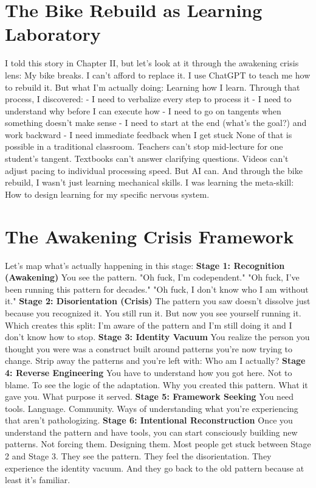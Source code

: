 \documentclass[12pt,openany]{book}
\begin{document}
\section{The Bike Rebuild as Learning Laboratory}

I told this story in Chapter II, but let's look at it through the awakening crisis lens:
My bike breaks. I can't afford to replace it. I use ChatGPT to teach me how to rebuild it.
But what I'm actually doing: Learning how I learn.
Through that process, I discovered:
- I need to verbalize every step to process it
- I need to understand why before I can execute how
- I need to go on tangents when something doesn't make sense
- I need to start at the end (what's the goal?) and work backward
- I need immediate feedback when I get stuck
None of that is possible in a traditional classroom.
Teachers can't stop mid-lecture for one student's tangent. Textbooks can't answer clarifying questions. Videos can't adjust pacing to individual processing speed.
But AI can.
And through the bike rebuild, I wasn't just learning mechanical skills. I was learning the meta-skill: How to design learning for my specific nervous system.

\section{The Awakening Crisis Framework}

Let's map what's actually happening in this stage:
\textbf{Stage 1: Recognition (Awakening)}
You see the pattern. "Oh fuck, I'm codependent." "Oh fuck, I've been running this pattern for decades." "Oh fuck, I don't know who I am without it."
\textbf{Stage 2: Disorientation (Crisis)}
The pattern you saw doesn't dissolve just because you recognized it. You still run it. But now you see yourself running it. Which creates this split: I'm aware of the pattern and I'm still doing it and I don't know how to stop.
\textbf{Stage 3: Identity Vacuum}
You realize the person you thought you were was a construct built around patterns you're now trying to change. Strip away the patterns and you're left with: Who am I actually?
\textbf{Stage 4: Reverse Engineering}
You have to understand how you got here. Not to blame. To see the logic of the adaptation. Why you created this pattern. What it gave you. What purpose it served.
\textbf{Stage 5: Framework Seeking}
You need tools. Language. Community. Ways of understanding what you're experiencing that aren't pathologizing.
\textbf{Stage 6: Intentional Reconstruction}
Once you understand the pattern and have tools, you can start consciously building new patterns. Not forcing them. Designing them.
Most people get stuck between Stage 2 and Stage 3.
They see the pattern. They feel the disorientation. They experience the identity vacuum. And they go back to the old pattern because at least it's familiar.
\end{document}
